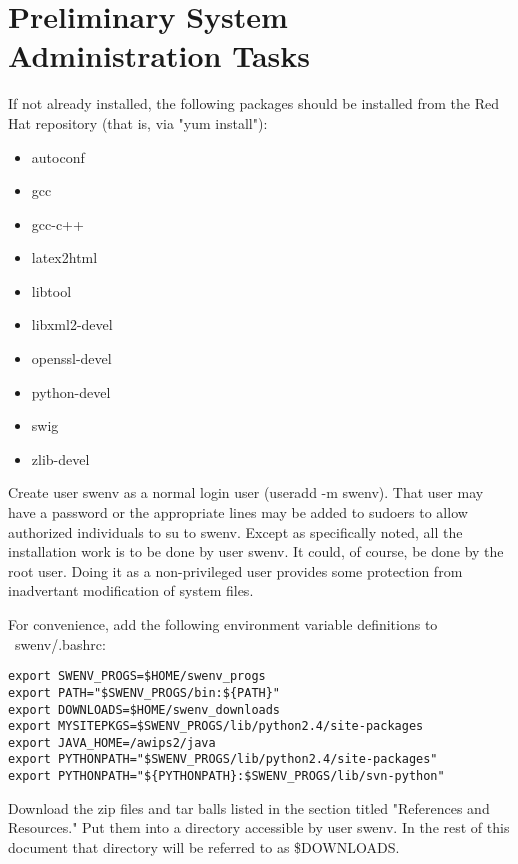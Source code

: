 
\section{Preliminary System Administration Tasks}


If not already installed, the following packages should be installed 
from the Red Hat repository (that is, via "yum install"):
\begin{itemize}
\item autoconf
\item gcc
\item gcc-c++
\item latex2html
\item libtool
\item libxml2-devel
\item openssl-devel
\item python-devel
\item swig
\item zlib-devel
\end{itemize}

Create user swenv as a normal login user (useradd -m swenv).  
That user may have a password or the appropriate lines may be 
added to sudoers to allow authorized individuals to su to swenv.  
Except as specifically noted, all the installation work is to be 
done by user swenv.  It could, of course, be done by the root user.  
Doing it as a non-privileged user provides some protection from 
inadvertant modification of system files.

For convenience, add the following environment variable definitions
to ~swenv/.bashrc:
\begin{verbatim}
export SWENV_PROGS=$HOME/swenv_progs
export PATH="$SWENV_PROGS/bin:${PATH}"
export DOWNLOADS=$HOME/swenv_downloads
export MYSITEPKGS=$SWENV_PROGS/lib/python2.4/site-packages
export JAVA_HOME=/awips2/java
export PYTHONPATH="$SWENV_PROGS/lib/python2.4/site-packages"
export PYTHONPATH="${PYTHONPATH}:$SWENV_PROGS/lib/svn-python"
\end{verbatim}

Download the zip files and tar balls listed in the section titled 
"References and Resources."  Put them into a directory accessible 
by user swenv.  In the rest of this document that directory will 
be referred to as \$DOWNLOADS.




